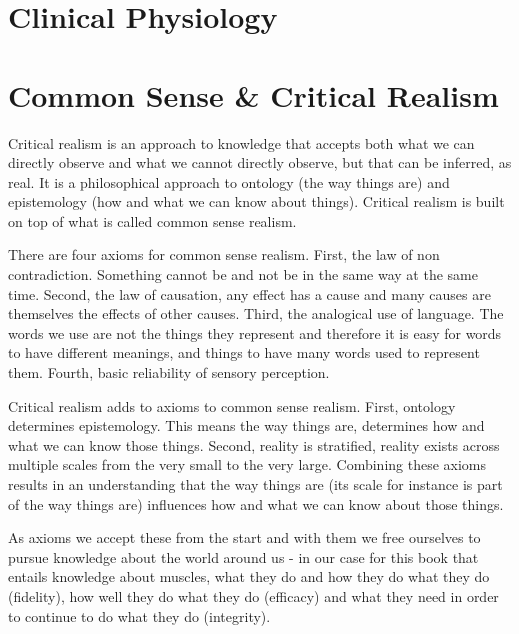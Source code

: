 \section{Clinical Physiology}




\section{Common Sense \& Critical Realism}

Critical realism is an approach to knowledge that accepts both what we can directly observe and what we cannot directly observe, but that can be inferred, as real. It is a philosophical approach to ontology (the way things are) and epistemology (how and what we can know about things). Critical realism is built on top of what is called common sense realism.

There are four axioms for common sense realism. First, the law of non contradiction. Something cannot be and not be in the same way at the same time. Second, the law of causation, any effect has a cause and many causes are themselves the effects of other causes. Third, the analogical use of language. The words we use are not the things they represent and therefore it is easy for words to have different meanings, and things to have many words used to represent them. Fourth, basic reliability of sensory perception. 

Critical realism adds to axioms to common sense realism. First, ontology determines epistemology. This means the way things are, determines how and what we can know those things. Second, reality is stratified, reality exists across multiple scales from the very small to the very large. Combining these axioms results in an understanding that the way things are (its scale for instance is part of the way things are) influences how and what we can know about those things. 



As axioms we accept these from the start and with them we free ourselves to pursue knowledge about the world around us - in our case for this book that entails knowledge about muscles, what they do and how they do what they do (fidelity), how well they do what they do (efficacy) and what they need in order to continue to do what they do (integrity). 


